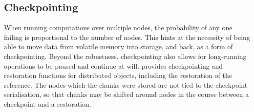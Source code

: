 \subsection{Checkpointing}

When running computations over multiple nodes, the probability of any one failing is proportional to the number of nodes.
This hints at the necessity of being able to move data from volatile memory into storage, and back, as a form of checkpointing.
Beyond the robustness, checkpointing also allows for long-running operations to be paused and continue at will.
\lsr provides checkpointing and restoration functions for distributed objects, including the restoration of the reference.
The nodes which the chunks were stored are not tied to the checkpoint serialisation, so that chunks may be shifted around nodes in the course between a checkpoint and a restoration.
